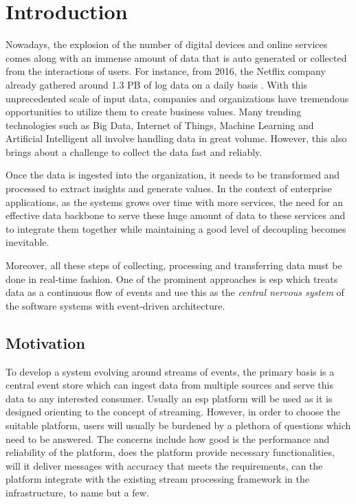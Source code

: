 \chapter{Introduction} \label{chap:intro}
Nowadays, the explosion of the number of digital devices and online services comes along with an immense amount of data that is auto generated or collected from the interactions of users. For instance, from 2016, the Netflix company already gathered around 1.3 PB of log data on a daily basis \cite{netflixpipeline}. With this unprecedented scale of input data, companies and organizations have tremendous opportunities to utilize them to create business values. Many trending technologies such as Big Data, Internet of Things, Machine Learning and Artificial Intelligent all involve handling data in great volume. However, this also brings about a challenge to collect the data fast and reliably.
 

Once the data is ingested into the organization, it needs to be transformed  and processed to extract insights and generate values. In the context of enterprise applications, as the systems grows over time with more services, the need for an effective data backbone to serve these huge amount of data to these services and to integrate them together while maintaining a good level of decoupling becomes inevitable.

Moreover, all these steps of collecting, processing and transferring data must be done in real-time fashion. One of the prominent approaches is \acrfull{esp} which treats data as a continuous flow of events and use this as the \emph{central nervous system} of the software systems with event-driven architecture.
 
\section{Motivation}
To develop a system evolving around streams of events, the primary basis is a central event store which can ingest data from multiple sources and serve this data to any interested consumer. Usually an \acrshort{esp} platform will be used as it is designed orienting to the concept of streaming. However, in order to choose the suitable platform, users will usually be burdened by a plethora of questions which need to be answered. The concerns include how good is the performance and reliability of the platform, does the platform provide necessary functionalities, will it deliver messages with accuracy that meets the requirements, can the platform integrate with the existing stream processing framework in the infrastructure, to name but a few.

